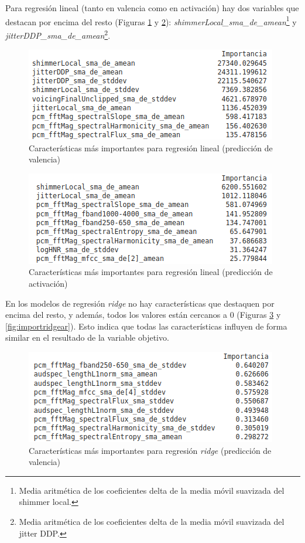 \documentclass[12pt,a4paper]{article}
\begin{document}
Para regresión lineal (tanto en valencia como en activación) hay dos variables que destacan por encima del resto (Figuras \ref{fig:importlinearregval} y \ref{fig:importlinearregar}): \textit{shimmerLocal\_sma\_de\_amean}\footnote{Media aritmética de los coeficientes delta de la media móvil suavizada del shimmer local.} y \textit{jitterDDP\_sma\_de\_amean}\footnote{Media aritmética de los coeficientes delta de la media móvil suavizada del jitter DDP.}.
\begin{figure}[H]
	\centering
	\includegraphics[width=0.7\linewidth]{figs/import_linear_reg_val}
	\caption{Características más importantes para regresión lineal (predicción de valencia)}
	\label{fig:importlinearregval}
\end{figure}
\begin{figure}[H]
	\centering
	\includegraphics[width=0.7\linewidth]{figs/import_linear_reg_ar}
	\caption{Características más importantes para regresión lineal (predicción de activación)}
	\label{fig:importlinearregar}
\end{figure}
En los modelos de regresión \textit{ridge} no hay características que destaquen por encima del resto, y además, todos los valores están cercanos a 0 (Figuras \ref{fig:importridgeval} y \ref{fig:importridgear}). Esto indica que todas las características influyen de forma similar en el resultado de la variable objetivo.
\begin{figure}[H]
	\centering
	\includegraphics[width=0.7\linewidth]{figs/import_ridge_val}
	\caption{Características más importantes para regresión \textit{ridge} (predicción de valencia)}
	\label{fig:importridgeval}
\end{figure}
\end{document}
